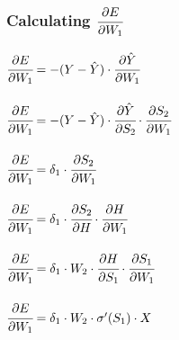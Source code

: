 \documentclass{article}
\begin{document}
\subsubsection{Calculating $\cfrac{\partial E}{\partial W_1}$}
$\cfrac{\partial E}{\partial W_1} = -(Y- \hat{Y})\cdot
\cfrac{\partial \hat{Y}}{\partial W_1}$\\
\\$\cfrac{\partial E}{\partial W_1} = -(Y- \hat{Y})\cdot
\cfrac{\partial \hat{Y}}{\partial S_2} \cdot \cfrac{\partial S_2}{\partial W_1}$\\
\\$\cfrac{\partial E}{\partial W_1} = \delta_1 \cdot \cfrac{\partial S_2}{\partial W_1}$\\
\\$\cfrac{\partial E}{\partial W_1} = \delta_1 \cdot \cfrac{\partial S_2}{\partial H}
\cdot \cfrac{\partial H}{\partial W_1}$\\
\\$\cfrac{\partial E}{\partial W_1} = \delta_1 \cdot W_2 \cdot
\cfrac{\partial H}{\partial S_1} \cdot \cfrac{\partial S_1}{\partial W_1}$\\
\\$\cfrac{\partial E}{\partial W_1} = \delta_1 \cdot W_2 \cdot
\sigma^\prime(S_1) \cdot X$\\
\end{document}
